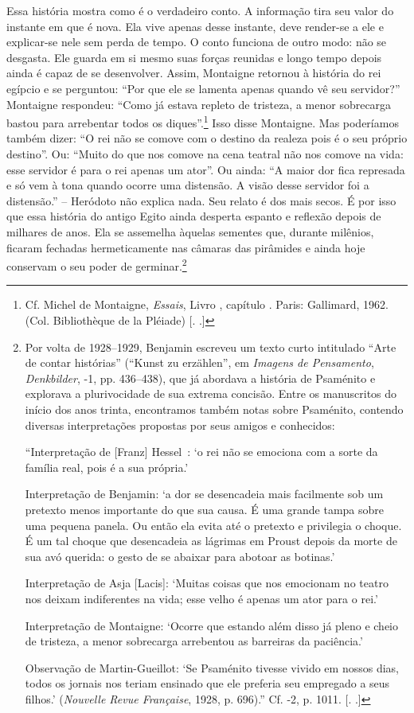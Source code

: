 Essa história mostra como é o verdadeiro conto. A informação tira seu
valor do instante em que é nova. Ela vive apenas desse instante, deve
render-se a ele e explicar-se nele sem perda de tempo. O conto funciona
de outro modo: não se desgasta. Ele guarda em si mesmo suas forças
reunidas e longo tempo depois ainda é capaz de se desenvolver. Assim,
Montaigne retornou à história do rei egípcio e se perguntou: ``Por que ele
se lamenta apenas quando vê seu servidor?'' Montaigne respondeu: ``Como já
estava repleto de tristeza, a menor sobrecarga bastou para arrebentar
todos os diques''.\footnote{Cf. Michel de Montaigne, \emph{Essais},
  Livro , capítulo . Paris: Gallimard, 1962. (Col. Bibliothèque de la
  Pléiade) [. .]} Isso disse Montaigne. Mas poderíamos também
dizer: ``O rei não se comove com o destino da realeza pois é o seu
próprio destino''. Ou: ``Muito do que nos comove na cena teatral não nos
comove na vida: esse servidor é para o rei apenas um ator''. Ou ainda:
``A maior dor fica represada e só vem à tona quando ocorre uma
distensão. A visão desse servidor foi a distensão.'' -- Heródoto não
explica nada. Seu relato é dos mais secos. É por isso que essa história
do antigo Egito ainda desperta espanto e reflexão depois de milhares de
anos. Ela se assemelha àquelas sementes que, durante milênios, ficaram
fechadas hermeticamente nas câmaras das pirâmides e ainda hoje conservam
o seu poder de germinar.\footnote{Por volta de 1928--1929, Benjamin
  escreveu um texto curto intitulado ``Arte de contar histórias''
  (``Kunst zu erzählen'', em \emph{Imagens de Pensamento},
  \emph{Denkbilder},  -1, pp. 436--438), que já abordava a história
  de Psaménito e explorava a plurivocidade de sua extrema concisão.
  Entre os manuscritos do início dos anos trinta, encontramos também
  notas sobre Psaménito, contendo diversas interpretações propostas por
  seus amigos e conhecidos:

  ``Interpretação de [Franz] Hessel~: `o rei não se emociona com a
  sorte da família real, pois é a sua própria.'

  Interpretação de Benjamin: `a dor se desencadeia mais facilmente sob
  um pretexto menos importante do que sua causa. É uma grande tampa
  sobre uma pequena panela. Ou então ela evita até o pretexto e
  privilegia o choque. É um tal choque que desencadeia as lágrimas em
  Proust depois da morte de sua avó querida: o gesto de se abaixar para
  abotoar as botinas.'

  Interpretação de Asja [Lacis]: `Muitas coisas que nos emocionam no
  teatro nos deixam indiferentes na vida; esse velho é apenas um ator
  para o rei.'

  Interpretação de Montaigne: `Ocorre que estando além disso já pleno e
  cheio de tristeza, a menor sobrecarga arrebentou as barreiras da
  paciência.'

  Observação de Martin-Gueillot: `Se Psaménito tivesse vivido em nossos
  dias, todos os jornais nos teriam ensinado que ele preferia seu
  empregado a seus filhos.' (\emph{Nouvelle Revue Française}, 1928, p.
  696).'' Cf.  -2, p. 1011. [. .]}

